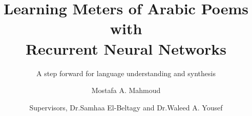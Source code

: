 \title[Learning Meters of Arabic Poems] %
{Learning Meters of Arabic Poems with \\ Recurrent Neural Networks}

\subtitle{A step forward
	for language understanding and synthesis}

\author[Moustafa A. Mahmoud] %
{Mostafa A. Mahmoud  
}



\date[\today] %
{Supervisors, Dr.Samhaa El-Beltagy and Dr.Waleed A. Yousef}



